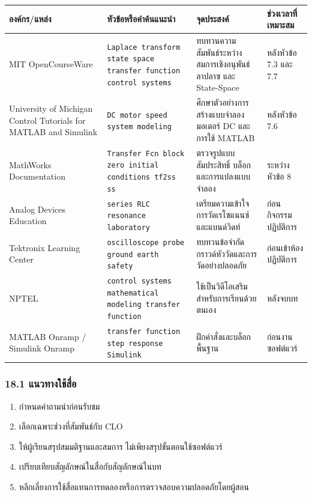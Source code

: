 \begin{table}[htbp]
    \centering
    \begin{tabular}{l l l l}
        \hline
        \textbf{องค์กร/แหล่ง} & \textbf{หัวข้อหรือคำค้นแนะนำ} & \textbf{จุดประสงค์} & \textbf{ช่วงเวลาที่เหมาะสม} \\
        \hline
        MIT OpenCourseWare & \texttt{Laplace transform state space transfer function control systems} & ทบทวนความสัมพันธ์ระหว่างสมการเชิงอนุพันธ์ ลาปลาซ และ State-Space & หลังหัวข้อ 7.3 และ 7.7 \\
        University of Michigan Control Tutorials for MATLAB and Simulink & \texttt{DC motor speed system modeling} & ศึกษาตัวอย่างการสร้างแบบจำลองมอเตอร์ DC และการใช้ MATLAB & หลังหัวข้อ 7.6 \\
        MathWorks Documentation & \texttt{Transfer Fcn block zero initial conditions tf2ss ss} & ตรวจรูปแบบสัมประสิทธิ์ บล็อก และการแปลงแบบจำลอง & ระหว่างหัวข้อ 8 \\
        Analog Devices Education & \texttt{series RLC resonance laboratory} & เตรียมความเข้าใจการวัดเรโซแนนซ์และแบนด์วิดท์ & ก่อนกิจกรรมปฏิบัติการ \\
        Tektronix Learning Center & \texttt{oscilloscope probe ground earth safety} & ทบทวนข้อจำกัดกราวด์หัววัดและการวัดอย่างปลอดภัย & ก่อนเข้าห้องปฏิบัติการ \\
        NPTEL & \texttt{control systems mathematical modeling transfer function} & ใช้เป็นวิดีโอเสริมสำหรับการเรียนด้วยตนเอง & หลังจบบท \\
        MATLAB Onramp / Simulink Onramp & \texttt{transfer function step response Simulink} & ฝึกคำสั่งและบล็อกพื้นฐาน & ก่อนงานซอฟต์แวร์ \\
        \hline
    \end{tabular}
\end{table}

\subsubsection{18.1 แนวทางใช้สื่อ}

\begin{enumerate}
    \item กำหนดคำถามนำก่อนรับชม
    \item เลือกเฉพาะช่วงที่สัมพันธ์กับ CLO
    \item ให้ผู้เรียนสรุปสมมติฐานและสมการ ไม่เพียงสรุปขั้นตอนใช้ซอฟต์แวร์
    \item เปรียบเทียบสัญลักษณ์ในสื่อกับสัญลักษณ์ในบท
    \item หลีกเลี่ยงการใช้สื่อแทนการทดลองหรือการตรวจสอบความปลอดภัยโดยผู้สอน
\end{enumerate}

